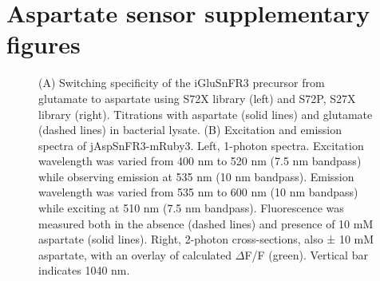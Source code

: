 \chapter{Aspartate sensor supplementary figures}

\begin{figure}[ht!]
    \centering
    \caption[Aspartate specificity and excitation/emission spectra.]{
    (A) Switching specificity of the iGluSnFR3 precursor from glutamate to aspartate using S72X library (left) and S72P, S27X library (right).
    Titrations with aspartate (solid lines) and glutamate (dashed lines) in bacterial lysate.
    (B) Excitation and emission spectra of jAspSnFR3-mRuby3.
    Left, 1-photon spectra.
    Excitation wavelength was varied from 400 nm to 520 nm (7.5 nm bandpass) while observing emission at 535 nm (10 nm bandpass).
    Emission wavelength was varied from 535 nm to 600 nm (10 nm bandpass) while exciting at 510 nm (7.5 nm bandpass).
    Fluorescence was measured both in the absence (dashed lines) and presence of 10 mM aspartate (solid lines).
    Right, 2-photon cross-sections, also ± 10 mM aspartate, with an overlay of calculated $\Delta$F/F (green).
    Vertical bar indicates 1040 nm.
    }
    \label{ch3:figsupp:f1S1}
\end{figure}

